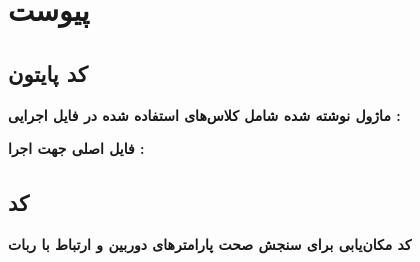 \chapter*{‌پیوست}
\section*{کد پایتون }
\textbf{ماژول نوشته شده شامل کلاس‌های استفاده شده در فایل اجرایی :}
\begin{latin}
	
\end{latin}

\textbf{فایل اصلی جهت اجرا :}

\begin{latin}
	
\end{latin}
\section{کد }
\textbf{کد مکان‌یابی برای سنجش صحت پارامتر‌های دوربین و ارتباط با ربات}
\begin{latin}
	
\end{latin}

